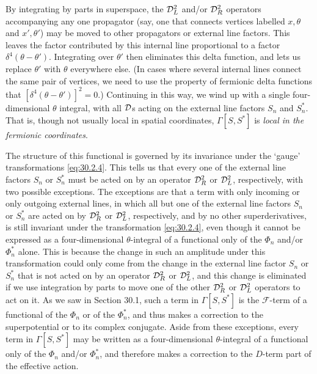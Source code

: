 By integrating by parts in superspace, the \(\mathcal{D}_L^2\) and/or
\(\mathcal{D}_R^2\) operators accompanying any one propagator (say, one that
connects vertices labelled \(x,\theta\) and \(x',\theta'\)) may be moved to
other propagators or external line factors. This leaves the factor contributed
by this internal line proportional to a factor
\(\delta^4(\theta-\theta')\). Integrating over \(\theta'\) then eliminates
this delta function, and lets us replace \(\theta'\) with \(\theta\)
everywhere else. (In cases where several internal lines connect the same pair
of vertices, we need to use the property of fermionic delta functions that
\([\delta^4(\theta-\theta')]^2=0\).) Continuing in this way, we wind up with a
single four-dimensional \(\theta\) integral, with all \(\mathcal{D}\)s acting on
the external line factors \(S_n\) and \(S_n^*\). That is, though not usually
local in spatial coordinates, \(\Gamma[S,S^*]\) is \emph{local in the
fermionic coordinates}.

The structure of this functional is governed by its invariance under the
`gauge' transformations \eqref{eq:30.2.4}. This tells us that every one of
the external line factors \(S_n\) or \(S_n^*\) must be acted on by an operator
\(\mathcal{D}_R^2\) or \(\mathcal{D}_L^2\), respectively, with two possible
exceptions. The exceptions are that a term with only incoming or only outgoing
external lines, in which all but one of the external line factors \(S_n\) or
\(S_n^*\) are acted on by \(\mathcal{D}_R^2\) or \(\mathcal{D}_L^2\), respectively,
and by no other superderivatives, is still invariant under the transformation
\eqref{eq:30.2.4}, even though it cannot be expressed as a four-dimensional
\(\theta\)-integral of a functional only of the \(\Phi_n\) and/or
\(\Phi_n^*\) alone. This is because the change in such an amplitude under this
transformation could only come from the change in the external line factor
\(S_n\) or \(S_n^*\) that is not acted on by an operator \(\mathcal{D}_R^2\) or
\(\mathcal{D}_L^2\), and this change is eliminated if we use integration by parts
to move one of the other \(\mathcal{D}_R^2\) or \(\mathcal{D}_L^2\) operators to act
on it. As we saw in Section 30.1, such a term in \(\Gamma[S,S^*]\) is the
\(\mathcal{F}\)-term of a functional of the \(\Phi_n\) or of the
\(\Phi_n^*\), and thus makes a correction to the superpotential or to its
complex conjugate. Aside from these exceptions, every term in
\(\Gamma[S,S^*]\) may be written as a four-dimensional \(\theta\)-integral
of a functional only of the \(\Phi_n\) and/or \(\Phi_n^*\), and therefore
makes a correction to the \(D\)-term part of the effective action.

